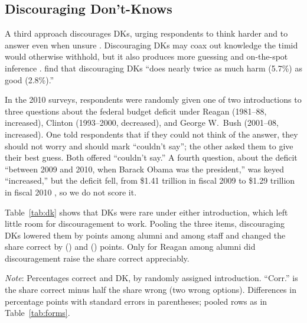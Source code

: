 \documentclass[11pt]{article}
\begin{document}
\subsection{Discouraging Don't-Knows}

A third approach discourages DKs, urging respondents to think harder and to answer even when unsure \citep{mondak1999, mondak2001}. Discouraging DKs may coax out knowledge the timid would otherwise withhold, but it also produces more guessing and on-the-spot inference \citep{luskin2011, sturgis2008}. \citet{luskin2011} find that discouraging DKs ``does nearly twice as much harm (5.7\%) as good (2.8\%).''

In the 2010 surveys, respondents were randomly given one of two introductions to three questions about the federal budget deficit under Reagan (1981--88, increased), Clinton (1993--2000, decreased), and George W.\ Bush (2001--08, increased). One told respondents that if they could not think of the answer, they should not worry and should mark ``couldn't say''; the other asked them to give their best guess. Both offered ``couldn't say.'' A fourth question, about the deficit ``between 2009 and 2010, when Barack Obama was the president,'' was keyed ``increased,'' but the deficit fell, from \$1.41 trillion in fiscal 2009 to \$1.29 trillion in fiscal 2010 \citep{omb2026}, so we do not score it.

Table~\ref{tab:dk} shows that DKs were rare under either introduction, which left little room for discouragement to work. Pooling the three items, discouraging DKs lowered them by \dkDkAlumni{} points among alumni and \dkDkStaff{} among staff and changed the share correct by \dkCorrectAlumni{} (\dkCorrectAlumniSe) and \dkCorrectStaff{} (\dkCorrectStaffSe) points. Only for Reagan among alumni did discouragement raise the share correct appreciably.

\begin{table}[htbp]
\centering\TableStyle
\caption{DK-encouraging and DK-discouraging introductions to the deficit questions.}
\label{tab:dk}
\begin{minipage}{0.95\linewidth}\footnotesize
\emph{Note}: Percentages correct and DK, by randomly assigned introduction. ``Corr.'' is the share correct minus half the share wrong (two wrong options). Differences in percentage points with standard errors in parentheses; pooled rows as in Table~\ref{tab:forms}.
\end{minipage}
\end{table}
\end{document}
